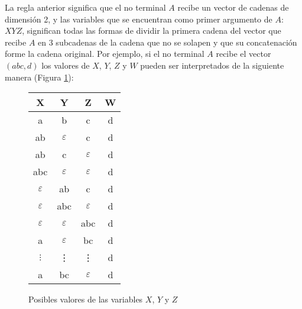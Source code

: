 \documentclass[12pt]{article}
\begin{document}





La regla anterior significa que el no terminal $A$ recibe un vector de cadenas de dimensión 2, y las variables que se encuentran como primer argumento
de $A$: $XYZ$, significan todas las formas de dividir la primera cadena del vector que recibe $A$ en 3 subcadenas de la cadena que no se solapen
y que su concatenación forme la cadena original. Por ejemplo, si el no terminal $A$ recibe el vector $(abc,d)$ los valores de $X$, $Y$, $Z$ y $W$
pueden ser interpretados de la siguiente manera (Figura \ref{fig:xyz_eaxmple}):

\begin{figure}
    \centering
    \begin{tabular}{|c|c|c|c|}
        \hline
        X             & Y             & Z             & W \\
        \hline
        a             & b             & c             & d \\
        \hline
        ab            & $\varepsilon$ & c             & d \\
        \hline
        ab            & c             & $\varepsilon$ & d \\
        \hline
        abc           & $\varepsilon$ & $\varepsilon$ & d \\
        \hline
        $\varepsilon$ & ab            & c             & d \\
        \hline
        $\varepsilon$ & abc           & $\varepsilon$ & d \\
        \hline
        $\varepsilon$ & $\varepsilon$ & abc           & d \\
        \hline
        a             & $\varepsilon$ & bc            & d \\
        \hline
        $\vdots$      & \vdots        & \vdots        & d \\
        \hline
        a             & bc            & $\varepsilon$ & d \\
        \hline
    \end{tabular}
    \caption{Posibles valores de las variables $X$, $Y$ y $Z$}
    \label{fig:xyz_eaxmple}
\end{figure}
\end{document}
